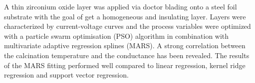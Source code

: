 A thin zirconium oxide layer was applied via doctor blading onto a steel foil substrate with the goal of get a homogeneous and insulating layer.
Layers were characterized by current-voltage curves and the process variables were optimized with a particle swarm optimisation (PSO) algorithm in combination with multivariate adaptive regression splines (MARS).
A strong correlation between the calcination temperature and the conductance has been revealed. 
The results of the MARS fitting performed well compared to linear regression, kernel ridge regression and support vector regression.
